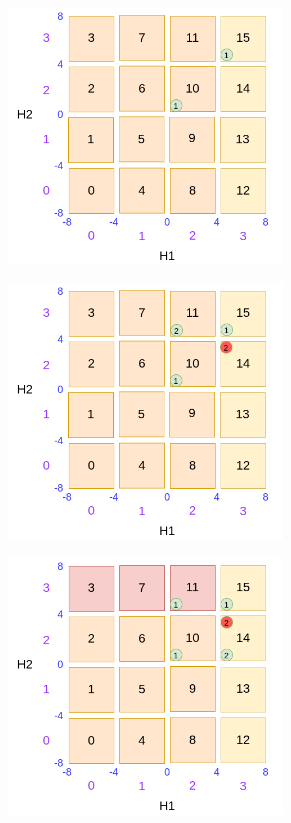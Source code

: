 \begin{figure}
\begin{subfigure}{0.45\textwidth}
		\includegraphics[width=0.8\textwidth]{figures/draw/c.png}
		\caption{}
		\label{fig:dsbo-example-c}
	\end{subfigure}
	\begin{subfigure}{0.45\textwidth}
		\includegraphics[width=0.8\textwidth]{figures/draw/d.png}
		\caption{}
		\label{fig:dsbo-example-d}
	\end{subfigure}
	\begin{subfigure}{0.45\textwidth}
		\includegraphics[width=0.8\textwidth]{figures/draw/e.png}

\end{subfigure}
\end{figure}
